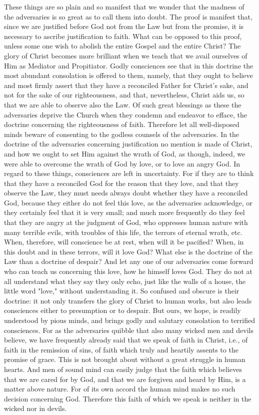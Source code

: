 These things are so plain and so manifest that we wonder that the
madness of the adversaries is so great as to call them into doubt.
The proof is manifest that, since we are justified before God not
from the Law but from the promise, it is necessary to ascribe
justification to faith.  What can be opposed to this proof, unless
some one wish to abolish the entire Gospel and the entire Christ?
The glory of Christ becomes more brilliant when we teach that we
avail ourselves of Him as Mediator and Propitiator.  Godly
consciences see that in this doctrine the most abundant consolation
is offered to them, namely, that they ought to believe and most
firmly assert that they have a reconciled Father for Christ's sake,
and not for the sake of our righteousness, and that, nevertheless,
Christ aids us, so that we are able to observe also the Law.  Of such
great blessings as these the adversaries deprive the Church when they
condemn and endeavor to efface, the doctrine concerning the
righteousness of faith.  Therefore let all well-disposed minds beware
of consenting to the godless counsels of the adversaries.  In the
doctrine of the adversaries concerning justification no mention is
made of Christ, and how we ought to set Him against the wrath of God,
as though, indeed, we were able to overcome the wrath of God by love,
or to love an angry God.  In regard to these things, consciences are
left in uncertainty.  For if they are to think that they have a
reconciled God for the reason that they love, and that they observe
the Law, they must needs always doubt whether they have a reconciled
God, because they either do not feel this love, as the adversaries
acknowledge, or they certainly feel that it is very small; and much
more frequently do they feel that they are angry at the judgment of
God, who oppresses human nature with many terrible evils, with
troubles of this life, the terrors of eternal wrath, etc. When,
therefore, will conscience be at rest, when will it be pacified?
When, in this doubt and in these terrors, will it love God?  What
else is the doctrine of the Law than a doctrine of despair?  And let
any one of our adversaries come forward who can teach us concerning
this love, how he himself loves God.  They do not at all understand
what they say they only echo, just like the walls of a house, the
little word "love," without understanding it.  So confused and
obscure is their doctrine: it not only transfers the glory of Christ
to human works, but also leads consciences either to presumption or
to despair.  But ours, we hope, is readily understood by pious minds,
and brings godly and salutary consolation to terrified consciences.
For as the adversaries quibble that also many wicked men and devils
believe, we have frequently already said that we speak of faith in
Christ, i.e., of faith in the remission of sins, of faith which truly
and heartily assents to the promise of grace.  This is not brought
about without a great struggle in human hearts.  And men of sound
mind can easily judge that the faith which believes that we are cared
for by God, and that we are forgiven and heard by Him, is a matter
above nature.  For of its own accord the human mind makes no such
decision concerning God.  Therefore this faith of which we speak is
neither in the wicked nor in devils.

